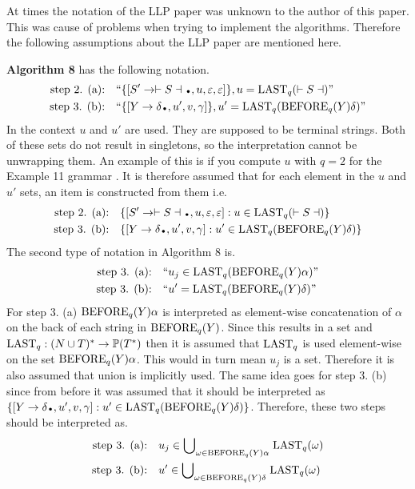 At times the notation of the LLP paper \cite{Vagner2007} was unknown to the author of this paper. This was cause of problems when trying to implement the algorithms. Therefore the following assumptions about the LLP paper \cite{Vagner2007} are mentioned here.

\textbf{Algorithm 8} \cite[13]{Vagner2007} has the following notation.
\begin{align*}
    \text{step 2. (a):}& \quad \text{``}\{[S' \to \vdash S \dashv \bigdot , u, \varepsilon, \varepsilon]\}, u = \LAST_q(\vdash S \dashv)\text{''} \\
    \text{step 3. (b):}& \quad \text{``}\{[Y \to \delta \bigdot , u', v, \gamma]\}, u' = \LAST_q(\BEFORE_q(Y)\delta)\text{''}
\end{align*}    
In the context $u$ and $u'$ are used. They are supposed to be terminal strings. Both of these sets do not result in singletons, so the interpretation cannot be unwrapping them. An example of this is if you compute $u$ with $q=2$ for the Example 11 grammar \cite[14]{Vagner2007}. It is therefore assumed that for each element in the $u$ and $u'$ sets, an item is constructed from them i.e.
\begin{align*}
    \text{step 2. (a):}& \quad \{[S' \to \vdash S \dashv \bigdot, u, \varepsilon, \varepsilon] : u \in \LAST_q(\vdash S \dashv)\} \\
    \text{step 3. (b):}& \quad \{[Y \to \delta \bigdot , u', v, \gamma] : u' \in \LAST_q(\BEFORE_q(Y)\delta)\}
\end{align*}
The second type of notation in Algorithm 8 is.
\begin{align*}
    \text{step 3. (a):}& \quad \text{``} u_j \in \text{LAST}_q(\text{BEFORE}_q(Y) \alpha)\text{''} \\
    \text{step 3. (b):}& \quad \text{``} u' = \text{LAST}_q(\text{BEFORE}_q(Y)\delta)\text{''}
\end{align*}    
For step 3. (a) $\text{BEFORE}_q(Y) \alpha$ is interpreted as element-wise concatenation of $\alpha$ on the back of each string in $\text{BEFORE}_q(Y)$. Since this results in a set and $\text{LAST}_q: (N \cup T)^* \to \mathbb{P}(T^*)$ then it is assumed that $\text{LAST}_q$ is used element-wise on the set $\text{BEFORE}_q(Y) \alpha$. This would in turn mean $u_j$ is a set. Therefore it is also assumed that union is implicitly used. The same idea goes for step 3. (b) since from before it was assumed that it should be interpreted as $\{[Y \to \delta \bigdot , u', v, \gamma] : u' \in \LAST_q(\BEFORE_q(Y)\delta)\}$. Therefore, these two steps should be interpreted as.
\begin{align*}
    \text{step 3. (a):}& \quad u_j \in \text{$\bigcup$}_{\omega \in \text{BEFORE}_q(Y) \alpha} \; \text{LAST}_q(\omega) \\
    \text{step 3. (b):}& \quad  u' \in \text{$\bigcup$}_{\omega \in \text{BEFORE}_q(Y) \delta} \; \text{LAST}_q(\omega)
\end{align*}
